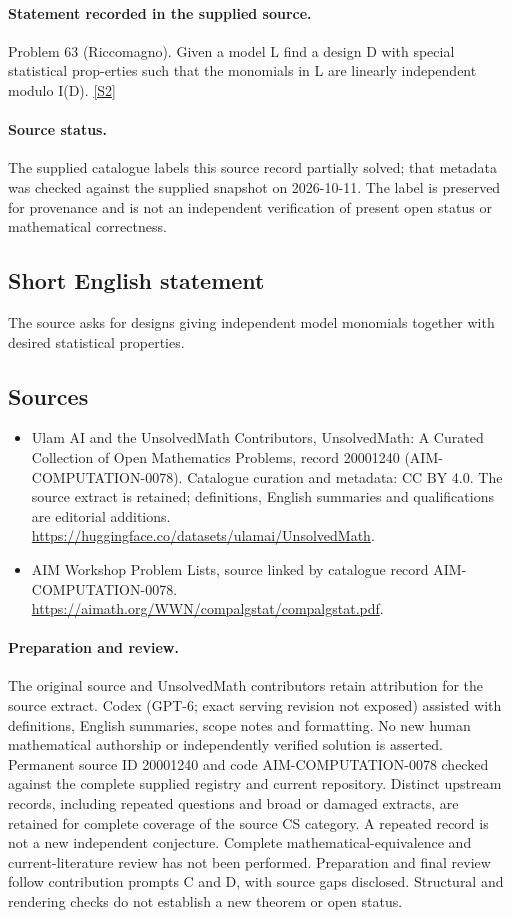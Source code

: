 \documentclass[11pt]{article}
\begin{document}
\paragraph{Statement recorded in the supplied source.}
Problem 63 (Riccomagno). Given a model L find a design D with special statistical prop-erties such that the monomials in L are linearly independent modulo I(D). \href{https://aimath.org/WWN/compalgstat/compalgstat.pdf}{[S2]}
\paragraph{Source status.}
The supplied catalogue labels this source record partially solved; that metadata was checked against the supplied snapshot on 2026-10-11. The label is preserved for provenance and is not an independent verification of present open status or mathematical correctness.
\subsection{Short English statement}
The source asks for designs giving independent model monomials together with desired statistical properties.
\subsection{Sources}
\begin{itemize}
\item[S1] Ulam AI and the UnsolvedMath Contributors, UnsolvedMath: A Curated Collection of Open Mathematics Problems, record 20001240 (AIM-COMPUTATION-0078). Catalogue curation and metadata: CC BY 4.0. The source extract is retained; definitions, English summaries and qualifications are editorial additions.
\url{https://huggingface.co/datasets/ulamai/UnsolvedMath}.
\item[S2] AIM Workshop Problem Lists, source linked by catalogue record AIM-COMPUTATION-0078.
\url{https://aimath.org/WWN/compalgstat/compalgstat.pdf}.
\end{itemize}
\paragraph{Preparation and review.}
The original source and UnsolvedMath contributors retain attribution for the source extract. Codex (GPT-6; exact serving revision not exposed) assisted with definitions, English summaries, scope notes and formatting. No new human mathematical authorship or independently verified solution is asserted. Permanent source ID 20001240 and code AIM-COMPUTATION-0078 checked against the complete supplied registry and current repository. Distinct upstream records, including repeated questions and broad or damaged extracts, are retained for complete coverage of the source CS category. A repeated record is not a new independent conjecture. Complete mathematical-equivalence and current-literature review has not been performed. Preparation and final review follow contribution prompts C and D, with source gaps disclosed. Structural and rendering checks do not establish a new theorem or open status.
\label{end:20001240}
\end{document}
